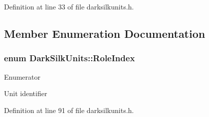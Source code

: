 Definition at line 33 of file darksilkunits.\+h.



\subsection{Member Enumeration Documentation}
\hypertarget{class_dark_silk_units_a39329690c784008fa8abd01e8bdde9b3}{}
\subsubsection[{Role\+Index}]{\setlength{\rightskip}{0pt plus 5cm}enum {\bf Dark\+Silk\+Units\+::\+Role\+Index}}\label{class_dark_silk_units_a39329690c784008fa8abd01e8bdde9b3}
\begin{Desc}
\item[Enumerator]\par
\begin{description}
\item[{\em 
\hypertarget{class_dark_silk_units_a39329690c784008fa8abd01e8bdde9b3ac0da3c9b33518a08612bb0ca9f57a396}{}Unit\+Role\label{class_dark_silk_units_a39329690c784008fa8abd01e8bdde9b3ac0da3c9b33518a08612bb0ca9f57a396}
}]Unit identifier \end{description}
\end{Desc}


Definition at line 91 of file darksilkunits.\+h.

\hypertarget{class_dark_silk_units_a492e7b4a5708e04f3a97609c07b733b9}{}
